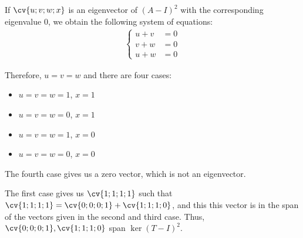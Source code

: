 \documentclass[11pt]{scrartcl}
\begin{document}
\begin{soln}
  If $\cv{u;v;w;x}$ is an eigenvector of $(A-I)^2$ with the
  corresponding eigenvalue $0$, we obtain the following system of
  equations:
  \begin{align}
    \begin{cases}
      u+v & = 0 \\
      v+w & =0  \\
      u + w & = 0
    \end{cases}
  \end{align}

  Therefore, $u=v=w$ and there are four cases:
\begin{itemize}
\item   $u=v=w=1$, $x=1$
\item $u=v=w=0$, $x=1$
\item   $u=v=w=1$, $x=0$
\item $u=v=w=0$, $x=0$
\end{itemize}

The fourth case gives us a zero vector, which is not an eigenvector.

The first case gives us $\cv{1;1;1;1}$ such that
$\cv{1;1;1;1} = \cv{0;0;0;1}+\cv{1;1;1;0}$, and this this vector is in
the span of the vectors given in the second and third case. Thus, $\cv{0;0;0;1}, \cv{1;1;1;0}$ span $\ker (T-I)^2$.


\end{soln}
\end{document}
